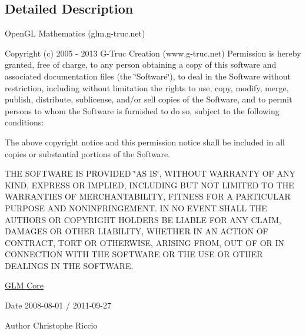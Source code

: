 \subsection{Detailed Description}
Open\+G\+L Mathematics (glm.\+g-\/truc.\+net)

Copyright (c) 2005 -\/ 2013 G-\/\+Truc Creation (www.\+g-\/truc.\+net) Permission is hereby granted, free of charge, to any person obtaining a copy of this software and associated documentation files (the \char`\"{}\+Software\char`\"{}), to deal in the Software without restriction, including without limitation the rights to use, copy, modify, merge, publish, distribute, sublicense, and/or sell copies of the Software, and to permit persons to whom the Software is furnished to do so, subject to the following conditions\+:

The above copyright notice and this permission notice shall be included in all copies or substantial portions of the Software.

T\+H\+E S\+O\+F\+T\+W\+A\+R\+E I\+S P\+R\+O\+V\+I\+D\+E\+D \char`\"{}\+A\+S I\+S\char`\"{}, W\+I\+T\+H\+O\+U\+T W\+A\+R\+R\+A\+N\+T\+Y O\+F A\+N\+Y K\+I\+N\+D, E\+X\+P\+R\+E\+S\+S O\+R I\+M\+P\+L\+I\+E\+D, I\+N\+C\+L\+U\+D\+I\+N\+G B\+U\+T N\+O\+T L\+I\+M\+I\+T\+E\+D T\+O T\+H\+E W\+A\+R\+R\+A\+N\+T\+I\+E\+S O\+F M\+E\+R\+C\+H\+A\+N\+T\+A\+B\+I\+L\+I\+T\+Y, F\+I\+T\+N\+E\+S\+S F\+O\+R A P\+A\+R\+T\+I\+C\+U\+L\+A\+R P\+U\+R\+P\+O\+S\+E A\+N\+D N\+O\+N\+I\+N\+F\+R\+I\+N\+G\+E\+M\+E\+N\+T. I\+N N\+O E\+V\+E\+N\+T S\+H\+A\+L\+L T\+H\+E A\+U\+T\+H\+O\+R\+S O\+R C\+O\+P\+Y\+R\+I\+G\+H\+T H\+O\+L\+D\+E\+R\+S B\+E L\+I\+A\+B\+L\+E F\+O\+R A\+N\+Y C\+L\+A\+I\+M, D\+A\+M\+A\+G\+E\+S O\+R O\+T\+H\+E\+R L\+I\+A\+B\+I\+L\+I\+T\+Y, W\+H\+E\+T\+H\+E\+R I\+N A\+N A\+C\+T\+I\+O\+N O\+F C\+O\+N\+T\+R\+A\+C\+T, T\+O\+R\+T O\+R O\+T\+H\+E\+R\+W\+I\+S\+E, A\+R\+I\+S\+I\+N\+G F\+R\+O\+M, O\+U\+T O\+F O\+R I\+N C\+O\+N\+N\+E\+C\+T\+I\+O\+N W\+I\+T\+H T\+H\+E S\+O\+F\+T\+W\+A\+R\+E O\+R T\+H\+E U\+S\+E O\+R O\+T\+H\+E\+R D\+E\+A\+L\+I\+N\+G\+S I\+N T\+H\+E S\+O\+F\+T\+W\+A\+R\+E.

\hyperlink{group__core}{G\+L\+M Core}

\begin{DoxyDate}{Date}
2008-\/08-\/01 / 2011-\/09-\/27 
\end{DoxyDate}
\begin{DoxyAuthor}{Author}
Christophe Riccio 
\end{DoxyAuthor}

